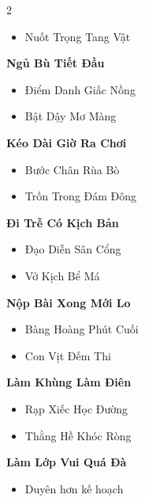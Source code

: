 \begin{multicols}{2}
\begin{itemize}[leftmargin=1.2em, itemsep=0.1em, label=\textcolor{titlecolor}{\tiny$\blacksquare$}]
  \item Nuốt Trọng Tang Vật
\end{itemize}
\vspace{0.8em}
\textbf{\color{chapterline}Ngủ Bù Tiết Đầu}
\begin{itemize}[leftmargin=1.2em, itemsep=0.1em, label=\textcolor{titlecolor}{\tiny$\blacksquare$}]
  \item Điểm Danh Giấc Nồng
  \item Bật Dậy Mơ Màng
\end{itemize}
\vspace{0.8em}
\textbf{\color{chapterline}Kéo Dài Giờ Ra Chơi}
\begin{itemize}[leftmargin=1.2em, itemsep=0.1em, label=\textcolor{titlecolor}{\tiny$\blacksquare$}]
  \item Bước Chân Rùa Bò
  \item Trốn Trong Đám Đông
\end{itemize}
\vspace{0.8em}
\textbf{\color{chapterline}Đi Trễ Có Kịch Bản}
\begin{itemize}[leftmargin=1.2em, itemsep=0.1em, label=\textcolor{titlecolor}{\tiny$\blacksquare$}]
  \item Đạo Diễn Sân Cổng
  \item Vở Kịch Bể Má
\end{itemize}
\vspace{0.8em}
\textbf{\color{chapterline}Nộp Bài Xong Mới Lo}
\begin{itemize}[leftmargin=1.2em, itemsep=0.1em, label=\textcolor{titlecolor}{\tiny$\blacksquare$}]
  \item Bàng Hoàng Phút Cuối
  \item Con Vịt Đếm Thi
\end{itemize}
\vspace{0.8em}
\textbf{\color{chapterline}Làm Khùng Làm Điên}
\begin{itemize}[leftmargin=1.2em, itemsep=0.1em, label=\textcolor{titlecolor}{\tiny$\blacksquare$}]
  \item Rạp Xiếc Học Đường
  \item Thằng Hề Khóc Ròng
\end{itemize}
\vspace{0.8em}
\textbf{\color{chapterline}Làm Lớp Vui Quá Đà}
\begin{itemize}[leftmargin=1.2em, itemsep=0.1em, label=\textcolor{titlecolor}{\tiny$\blacksquare$}]
  \item Duyên hơn kế hoạch
\end{itemize}

\end{multicols}
